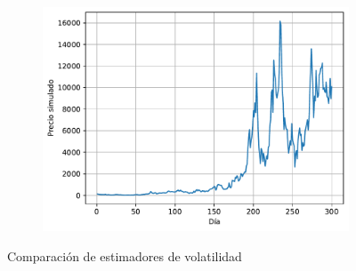 \begin{figure}[H]
\begin{subfigure}[b]{0.45\linewidth}
        \includegraphics[width=\linewidth]{Imagenes/Parte1/7_Volatilidad/Accion.pdf}
    \end{subfigure}
    \caption{Comparación de estimadores de volatilidad}
\end{figure}



